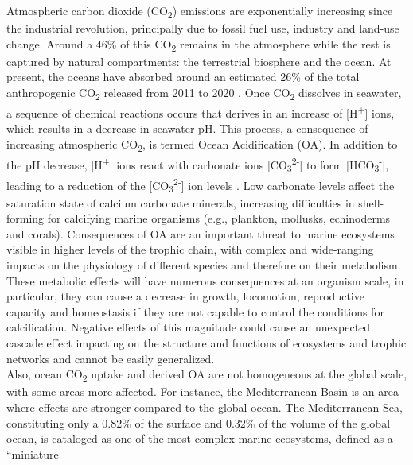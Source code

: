 Atmospheric carbon dioxide (CO\textsubscript{2}) emissions are
exponentially increasing since the industrial revolution, principally due to
fossil fuel use, industry and land-use change. Around a 46\% of this
CO\textsubscript{2} remains in the atmosphere while the rest is captured by
natural compartments: the terrestrial biosphere and the
ocean\cite{Friedlingstein2021}.  At present, the oceans have absorbed around an
estimated 26\% of the total anthropogenic CO\textsubscript{2} released from
2011 to 2020 \cite{Friedlingstein2021}. Once CO\textsubscript{2} dissolves in
seawater, a sequence of chemical reactions occurs that derives in an increase
of [H\textsuperscript{+}] ions, which results in a decrease in seawater pH.
This process, a consequence of increasing atmospheric CO\textsubscript{2}, is
termed Ocean Acidification (OA)\cite{caldeira2003anthropogenic}. In addition to
the pH decrease, [H\textsuperscript{+}] ions react with carbonate ions
    [CO\textsubscript{3}\textsuperscript{2-}] to form
    [HCO\textsubscript{3}\textsuperscript{-}], leading to a reduction of the
    [CO\textsubscript{3}\textsuperscript{2-}] ion levels \cite{doney2009ocean}.
Low
carbonate levels affect the saturation state of calcium carbonate minerals,
increasing difficulties in shell-forming for calcifying marine organisms (e.g.,
plankton, mollusks, echinoderms and corals). Consequences of OA are an
important threat to marine ecosystems visible in higher levels of the trophic
chain, with complex and wide-ranging impacts on the physiology of different
species and therefore on their
metabolism\cite{kroeker2013impacts,nilsson2012near}. These metabolic effects
will have numerous consequences at an organism scale, in particular, they can
cause a decrease in growth, locomotion, reproductive capacity and homeostasis
if they are not capable to control the conditions for
calcification\cite{hendriks2015biological}. Negative effects of this magnitude
could cause an unexpected cascade effect impacting on the structure and
functions of ecosystems and trophic networks\cite{zunino2021impact} and cannot
be easily generalized.\\
Also, ocean CO\textsubscript{2} uptake and derived OA are not homogeneous
at the global scale, with some areas more affected. For instance, the
Mediterranean Basin is an area where effects are stronger compared to the
global ocean\cite{Giorgi2006}. The Mediterranean Sea, constituting only a
0.82\% of the surface and 0.32\% of the volume of the global ocean, is
cataloged as one of the most complex marine ecosystems, defined as a “miniature
